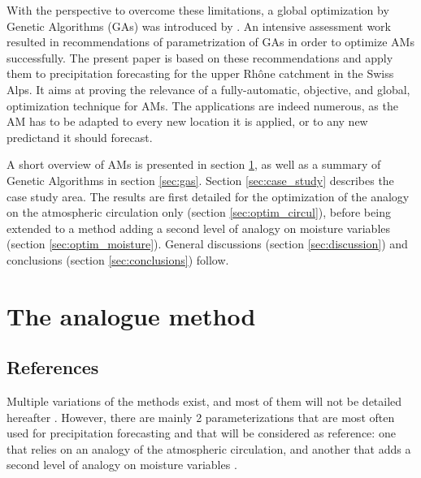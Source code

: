 \documentclass[5p]{elsarticle}
\begin{document}
With the perspective to overcome these limitations, a global optimization by Genetic Algorithms (GAs) was introduced by \citet{Horton2016a}. An intensive assessment work resulted in recommendations of parametrization of GAs in order to optimize AMs successfully. The present paper is based on these recommendations and apply them to precipitation forecasting for the upper Rh\^{o}ne catchment in the Swiss Alps. It aims at proving the relevance of a fully-automatic, objective, and global, optimization technique for AMs. The applications are indeed numerous, as the AM has to be adapted to every new location it is applied, or to any new predictand it should forecast.

A short overview of AMs is presented in section \ref{sec:analog_method}, as well as a summary of Genetic Algorithms in section \ref{sec:gas}. Section \ref{sec:case_study} describes the case study area. The results are first detailed for the optimization of the analogy on the atmospheric circulation only (section \ref{sec:optim_circul}), before being extended to a method adding a second level of analogy on moisture variables (section \ref{sec:optim_moisture}). General discussions (section \ref{sec:discussion}) and conclusions (section \ref{sec:conclusions}) follow.


\section{The analogue method}
\label{sec:analog_method}

\subsection{References}
\label{sec:references}

Multiple variations of the methods exist, and most of them will not be detailed hereafter \cite[see][for more comprehensive listings]{Horton2016, BenDaoud2015}. However, there are mainly 2 parameterizations that are most often used for precipitation forecasting and that will be considered as reference: one that relies on an analogy of the atmospheric circulation, and another that adds a second level of analogy on moisture variables \citep{Obled2002, Bontron2005, Marty2012}.
\end{document}
